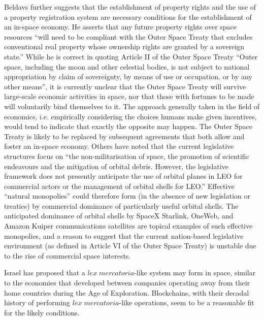 \documentclass[journal ]{new-aiaa}
\begin{document}
Beldavs\cite{beldavs_blockchains_2016} further suggests that the establishment of property rights and the use of a property registration system are necessary conditions for the establishment of an in-space economy\cite{beldavs_blockchains_2016}. He asserts that any future property rights over space resources ``will need to be compliant with the Outer Space Treaty that excludes conventional real property whose ownership rights are granted by a sovereign state.'' While he is correct in quoting Article II of the Outer Space Treaty\cite{UNCPUOS_1967} ``Outer space, including the moon and other celestial bodies, is not subject to national appropriation by claim of sovereignty, by means of use or occupation, or by any other means'', it is currently unclear that the Outer Space Treaty will survive large-scale economic activities in space, nor that those with fortunes to be made will voluntarily bind themselves to it. The approach generally taken in the field of economics, i.e. empirically considering the choices humans make given incentives, would tend to indicate that exactly the opposite may happen. The Outer Space Treaty is likely to be replaced by subsequent agreements that both allow and foster an in-space economy. Others have noted that the current legislative structures focus on ``the non-militarisation of space, the promotion of scientific endeavours and the mitigation of orbital debris. However, the legislative framework does not presently anticipate the use of orbital planes in LEO for commercial actors or the management of orbital shells for LEO.''\cite{green_mitigation_2018} Effective ``natural monopolies'' could therefore form (in the absence of new legislation or treaties) by commercial dominance of particularly useful orbital shells. The anticipated dominance of orbital shells by SpaceX Starlink, OneWeb, and Amazon Kuiper communications satellites are topical examples of such effective monopolies, and a reason to suggest that the current nation-based legislative environment (as defined in Article VI of the Outer Space Treaty\cite{UNCPUOS_1967}) is unstable due to the rise of commercial space interests.

Israel has proposed that a $\mathit{lex\; mercatoria}$-like system may form in space, similar to the economies that developed between companies operating away from their home countries during the Age of Exploration\cite{israel_space_2019}. Blockchains, with their decadal history of performing $\mathit{lex\; mercatoria}$-like operations, seem to be a reasonable fit for the likely conditions.
\end{document}
